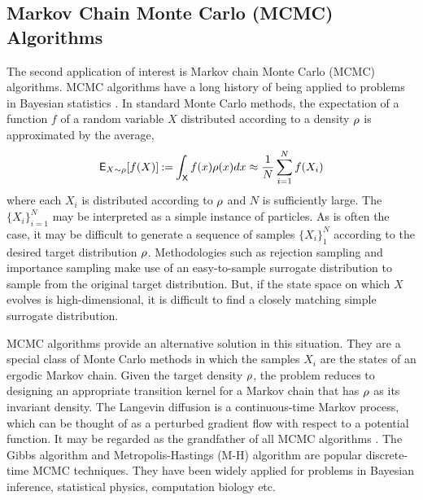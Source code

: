 \subsection{Markov Chain Monte Carlo (MCMC) Algorithms}
\label{s:mcmc}
The second application of interest is Markov chain Monte Carlo (MCMC) algorithms. MCMC algorithms have a long history of being applied to problems in Bayesian statistics \cite{asmgly07}. 
In standard Monte Carlo methods, the expectation of a function $f$ of a random variable $X$ distributed according to a density $\rho$ is approximated by the average,
\begin{equation}
 \Expect_{X \sim \pr} [f(X)] \eqdef \int_\state f(x)\pr(x) dx \approx \frac{1}{N} \sum_{i=1}^N f(X_i)
 \label{e:intro_emp_avg} 
\end{equation}
where each $X_i$ is distributed according to $\rho$ and $N$ is sufficiently large.  The $\{X_i\}_{i=1}^N$ may be interpreted as a simple instance of particles. As is often the case, it may be difficult to generate a sequence of samples $\{X_i\}_1^N$ according to the desired target distribution $\rho$. Methodologies such as rejection sampling and importance sampling make use of an easy-to-sample surrogate distribution to sample from the original target distribution. But, if the state space on which $X$ evolves is high-dimensional, it is difficult to find a closely matching simple surrogate distribution. 

MCMC algorithms provide an alternative solution in this situation. They are a special class of Monte Carlo methods in which the samples $X_i$ are the states of an ergodic Markov chain. Given the target density $\rho$, the problem reduces to designing an appropriate transition kernel for a Markov chain that has $\rho$ as its invariant density. The Langevin diffusion is a continuous-time Markov process, which can be thought of as a perturbed gradient flow with respect to a potential function. It may be regarded as the grandfather of all MCMC algorithms \cite{brodurmeymourad18}. The Gibbs algorithm \cite{tanwon87} and Metropolis-Hastings (M-H)  algorithm \cite{has70} are popular discrete-time MCMC techniques. They have been widely applied for problems in Bayesian inference, statistical physics, computation biology etc.

